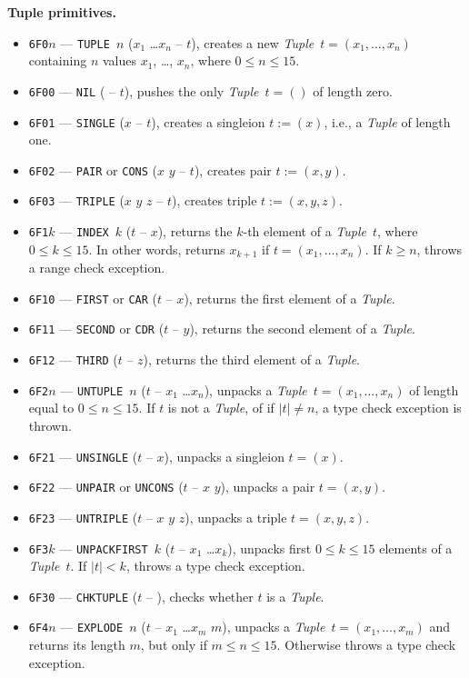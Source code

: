 \documentclass[12pt,oneside]{article}
\def\makepoint#1{\medbreak\noindent{\bf #1.\ }}
\def\nxsubpoint{\refstepcounter{subsubsection}%
  \smallbreak\makepoint{\thesubsubsection}}
\def\emb#1{\textbf{#1.}}
\begin{document}
\nxsubpoint\emb{Tuple primitives}\label{sp:prim.tuple}
\begin{itemize}
\item {\tt 6F0$n$} --- {\tt TUPLE $n$} ($x_1$ \dots $x_n$ -- $t$), creates a new {\em Tuple\/}~$t=(x_1,\ldots,x_n)$ containing $n$ values $x_1$, \dots, $x_n$, where $0\leq n\leq 15$.
\item {\tt 6F00} --- {\tt NIL} ( -- $t$), pushes the only {\em Tuple\/}~$t=()$ of length zero.
\item {\tt 6F01} --- {\tt SINGLE} ($x$ -- $t$), creates a singleion $t:=(x)$, i.e., a {\em Tuple\/} of length one.
\item {\tt 6F02} --- {\tt PAIR} or {\tt CONS} ($x$ $y$ -- $t$), creates pair $t:=(x,y)$.
\item {\tt 6F03} --- {\tt TRIPLE} ($x$ $y$ $z$ -- $t$), creates triple $t:=(x,y,z)$.
\item {\tt 6F1$k$} --- {\tt INDEX $k$} ($t$ -- $x$), returns the $k$-th element of a {\em Tuple\/}~$t$, where $0\leq k\leq 15$. In other words, returns $x_{k+1}$ if $t=(x_1,\ldots,x_n)$. If $k\geq n$, throws a range check exception.
\item {\tt 6F10} --- {\tt FIRST} or {\tt CAR} ($t$ -- $x$), returns the first element of a {\em Tuple}.
\item {\tt 6F11} --- {\tt SECOND} or {\tt CDR} ($t$ -- $y$), returns the second element of a {\em Tuple}.
\item {\tt 6F12} --- {\tt THIRD} ($t$ -- $z$), returns the third element of a {\em Tuple}.
\item {\tt 6F2$n$} --- {\tt UNTUPLE $n$} ($t$ -- $x_1$ \dots $x_n$), unpacks a {\em Tuple\/}~$t=(x_1,\ldots,x_n)$ of length equal to $0\leq n\leq 15$. If $t$ is not a {\em Tuple}, of if $|t|\neq n$, a type check exception is thrown.
\item {\tt 6F21} --- {\tt UNSINGLE} ($t$ -- $x$), unpacks a singleion $t=(x)$.
\item {\tt 6F22} --- {\tt UNPAIR} or {\tt UNCONS} ($t$ -- $x$ $y$), unpacks a pair $t=(x,y)$.
\item {\tt 6F23} --- {\tt UNTRIPLE} ($t$ -- $x$ $y$ $z$), unpacks a triple $t=(x,y,z)$.
\item {\tt 6F3$k$} --- {\tt UNPACKFIRST $k$} ($t$ -- $x_1$ \dots $x_k$), unpacks first $0\leq k\leq 15$ elements of a {\em Tuple\/}~$t$. If $|t|<k$, throws a type check exception.
\item {\tt 6F30} --- {\tt CHKTUPLE} ($t$ -- ), checks whether $t$ is a {\em Tuple}.
\item {\tt 6F4$n$} --- {\tt EXPLODE $n$} ($t$ -- $x_1$ \dots $x_m$ $m$), unpacks a {\em Tuple\/}~$t=(x_1,\ldots,x_m)$ and returns its length $m$, but only if $m\leq n\leq 15$. Otherwise throws a type check exception.

\end{itemize}
\end{document}

